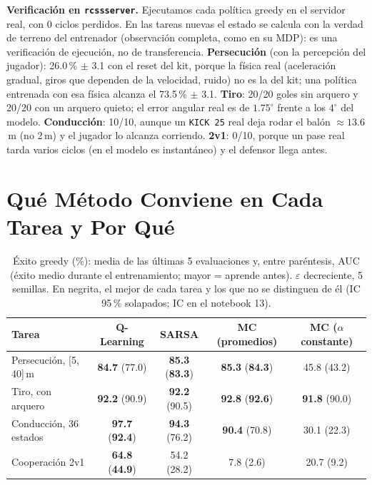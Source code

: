 \documentclass[11pt,a4paper]{article}
\newcommand{\transkit}{26.0\,\% $\pm$ 3.1}
\begin{document}
\textbf{Verificación en \texttt{rcssserver}.} Ejecutamos cada política greedy en el servidor real, con 0 ciclos
perdidos. En las tareas nuevas el estado se calcula con la verdad de terreno del entrenador (observación completa,
como en su MDP): es una verificación de ejecución, no de transferencia. \textbf{Persecución} (con la percepción del
jugador): \transkit{} con el reset del kit, porque la física real (aceleración gradual, giros que dependen de la
velocidad, ruido) no es la del kit; una política entrenada con esa física alcanza el 73.5\,\% $\pm$ 3.1. \textbf{Tiro}: 20/20 goles sin arquero y 20/20 con un arquero quieto; el error angular real es de
$1.75^\circ$ frente a los $4^\circ$ del modelo. \textbf{Conducción}: 10/10, aunque un \texttt{KICK 25} real deja rodar
el balón $\approx 13.6$\,m (no 2\,m) y el jugador lo alcanza corriendo. \textbf{2v1}: 0/10, porque un pase real tarda
varios ciclos (en el modelo es instantáneo) y el defensor llega antes.

\section{Qué Método Conviene en Cada Tarea y Por Qué}

\begin{table}[!htb]
\centering\small
\begin{tabular}{@{}lcccc@{}}
\toprule
Tarea & Q-Learning & SARSA & MC (promedios) & MC ($\alpha$ constante) \\
\midrule
Persecución, [5, 40]\,m & \textbf{84.7} (77.0) & \textbf{85.3} (\textbf{83.3}) & \textbf{85.3} (\textbf{84.3}) & 45.8 (43.2) \\
Tiro, con arquero & \textbf{92.2} (90.9) & \textbf{92.2} (90.5) & \textbf{92.8} (\textbf{92.6}) & \textbf{91.8} (90.0) \\
Conducción, 36 estados & \textbf{97.7} (\textbf{92.4}) & \textbf{94.3} (76.2) & \textbf{90.4} (70.8) & 30.1 (22.3) \\
Cooperación 2v1 & \textbf{64.8} (\textbf{44.9}) & 54.2 (28.2) & 7.8 (2.6) & 20.7 (9.2) \\
\bottomrule
\end{tabular}
\caption{Éxito greedy (\%): media de las últimas 5 evaluaciones y, entre paréntesis, AUC (éxito medio durante el
entrenamiento; mayor = aprende antes). $\varepsilon$ decreciente, 5 semillas. En negrita, el mejor de cada tarea y los
que no se distinguen de él (IC 95\,\% solapados; IC en el notebook 13).}
\label{tab:comp}
\end{table}
\end{document}
